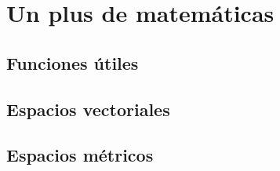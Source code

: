 \chapter{Un plus de matem\'aticas}
\section{Funciones \'utiles}
\section{Espacios vectoriales}
\section{Espacios m\'etricos}